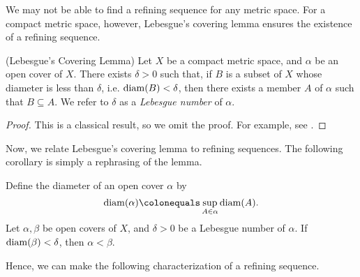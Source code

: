 \documentclass[12pt,twoside,draft]{book}
\begin{document}
We may not be able to find a refining sequence for any metric space.
For a compact metric space, however, Lebesgue's covering lemma ensures the existence of a refining sequence.
\begin{proposition}
  (Lebesgue's Covering Lemma)
  Let $X$ be a compact metric space, and $\alpha$ be an open cover of $X$.
  There exists $\delta > 0$ such that, if $B$ is a subset of $X$ whose diameter is less than $\delta$, i.e. $\mathrm{diam}(B) < \delta$, then there exists a member $A$ of $\alpha$ such that $B \subseteq A$.
  We refer to $\delta$ as a \textit{Lebesgue number} of $\alpha$.
  \label{lem:covering}
  \begin{proof}
    This is a classical result, so we omit the proof.
    For example, see \citet{royden}.
  \end{proof}
\end{proposition}
Now, we relate Lebesgue's covering lemma to refining sequences.
The following corollary is simply a rephrasing of the lemma.
\begin{corollary}
  Define the diameter of an open cover $\alpha$ by
  \begin{equation*}
    \diam(\alpha) \ceq \sup\limits_{A \in \alpha} \diam(A).
  \end{equation*}
  Let $\alpha, \beta$ be open covers of $X$, and $\delta > 0$ be a Lebesgue number of $\alpha$.
  If $\mathrm{diam}(\beta) < \delta$, then $\alpha < \beta$.
\end{corollary}
Hence, we can make the following characterization of a refining sequence.
\end{document}
